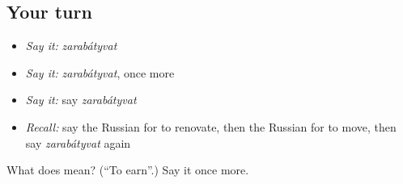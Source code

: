 \subsection*{Your turn}
\begin{itemize}
\raggedright
  \item \emph{Say it:} \emph{zarabátyvat}
  \item \emph{Say it:} \emph{zarabátyvat}, once more
  \item \emph{Say it:} say \emph{zarabátyvat}
  \item \emph{Recall:} say the Russian for to renovate, then the Russian for to move, then say \emph{zarabátyvat} again
\end{itemize}

\begin{tcolorbox}[breakable,colback=teal!4,colframe=teal!35!black,title={Before you move on}]
What does  mean? (\textquotedblleft{}To earn\textquotedblright{}.) Say it once more.
\end{tcolorbox}
